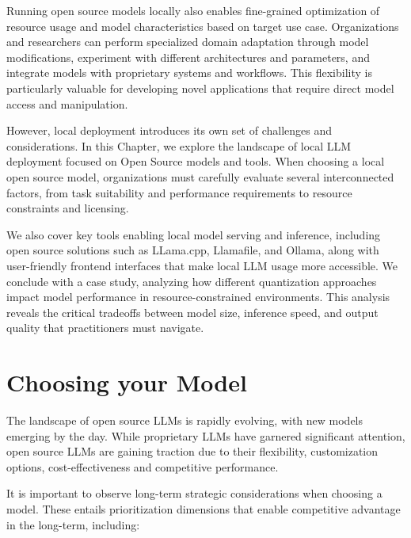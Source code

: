 Running open source models locally also enables fine-grained optimization of resource usage and model characteristics based on target use case. Organizations and researchers can perform specialized domain adaptation through model modifications, experiment with different architectures and parameters, and integrate models with proprietary systems and workflows. This flexibility is particularly valuable for developing novel applications that require direct model access and manipulation. 
 
However, local deployment introduces its own set of challenges and considerations. In this Chapter, we explore the landscape of local LLM deployment focused on Open Source models and tools. When choosing a local open source model, organizations must carefully evaluate several interconnected factors, from task suitability and performance requirements to resource constraints and licensing.
 
We also cover key tools enabling local model serving and inference, including open source solutions such as LLama.cpp, Llamafile, and Ollama, along with user-friendly frontend interfaces that make local LLM usage more accessible. We conclude with a case study, analyzing how different quantization approaches impact model performance in resource-constrained environments. This analysis reveals the critical tradeoffs between model size, inference speed, and output quality that practitioners must navigate.

\section{Choosing your Model}
\label{sec:local-model-selection}

The landscape of open source LLMs is rapidly evolving, with new models emerging by the day. While proprietary LLMs have garnered significant attention, open source LLMs are gaining traction due to their flexibility, customization options, cost-effectiveness and competitive performance. 

It is important to observe long-term strategic considerations when choosing a model. These entails prioritization dimensions that enable competitive advantage in the long-term, including:

